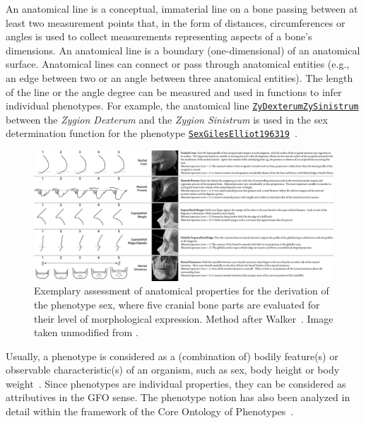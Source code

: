 \documentclass[sw]{iosart2x}
\newcommand{\anno}[1]{\href{https://annosaxfdm.de/ontology/#1}{\texttt{#1}}}
\begin{document}
An anatomical line is a conceptual, immaterial line on a bone passing between at least two measurement points that, in the form of distances, circumferences or angles is used to collect measurements representing aspects of a bone's dimensions.
An anatomical line is a boundary (one-dimensional) of an anatomical surface.
Anatomical lines can connect or pass through anatomical entities (e.g., an edge between two or an angle between three anatomical entities).
The length of the line or the angle degree can be measured and used in functions to infer individual phenotypes.%
For example, the anatomical line \anno{ZyDexterumZySinistrum} between the \emph{Zygion Dexterum} and the \emph{Zygion Sinistrum} is used in the sex determination function for the phenotype \anno{SexGilesElliot196319}~\citep{sexgileselliot1963}.

\begin{figure}[h]
\includegraphics[width=\textwidth]{img/phenotype.png}
\caption{
Exemplary assessment of anatomical properties for the derivation of the phenotype sex, where five cranial bone parts are evaluated for their level of morphological expression.
Method after Walker~\cite{datacollection}.
Image taken unmodified from \cite{datacollection}.
}\label{fig:phenotype}
\end{figure}

Usually, a phenotype is considered as a (combination of) bodily feature(s) or observable characteristic(s) of an organism, such as sex, body height or body weight~\citep{ontologicaltreatment,phenomes,interoperability}.
Since phenotypes are individual properties, they can be considered as attributives in the GFO sense.
The phenotype notion has also been analyzed in detail within the framework of the Core Ontology of Phenotypes~\citep{ontologicalrepresentation}.
\end{document}
